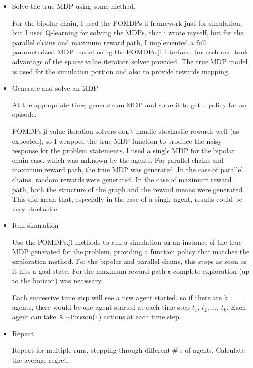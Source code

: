 \documentclass{article}
\begin{document}
  \begin{itemize}
  
\item Solve the true MDP using some method. 

For the bipolar chain, I used the POMDPs.jl framework just for simulation, but I used Q-learning for solving the MDPs, that i wrote myself, but for the parallel chains and maximum reward path, I implemented a full parameterized MDP model using the POMDPs.jl interfaces for each and took advantage of the sparse value iteration solver provided. The true MDP model is used for the simulation portion and also to provide rewards mapping. 

\item Generate and solve an MDP

At the appropriate time, generate an MDP and solve it to get a policy for an episode. 

POMDPs.jl value iteration solvers don't handle stochastic rewards well (as expected), so I wrapped the true MDP function to produce the noisy response for the problem statements. I used a single MDP for the bipolar chain case, which was unknown by the agents. For parallel chains and maximum reward path, the true MDP was generated. In the case of parallel chains, random rewards were generated. In the case of maximum reward path, both the structure of the graph and the reward means were generated. This did mean that, especially in the case of a single agent, results could be very stochastic.
  
\item Run simulation

Use the POMDPs.jl methods to run a simulation on an instance of the true MDP generated for the problem, providing a function policy that matches the exploration method. For the bipolar and parallel chains, this stops as soon as it hits a goal state. For the maximum reward path a complete exploration (up to the horizon) was necessary.

Each successive time step will see a new agent started, so if there are k agents, there would be one agent started at each time step $t_1$, $t_2$, ..., $t_k$. Each agent can take X \textasciitilde Poisson(1)  actions at each time step. 
\item Repeat

Repeat for multiple runs, stepping through different \#'s of agents. Calculate the average regret.

  
 \end{itemize}
 
\end{document}
